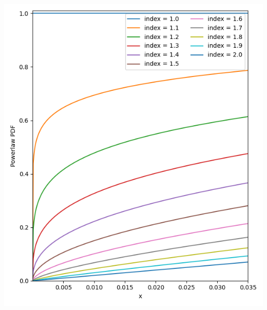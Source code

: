 \begin{minipage}[l]{0.45\columnwidth}
    \centering
    \includegraphics[width=\linewidth]{images/powerlaw}
    \label{fig:pl_distribution}
\end{minipage}
\hfill
